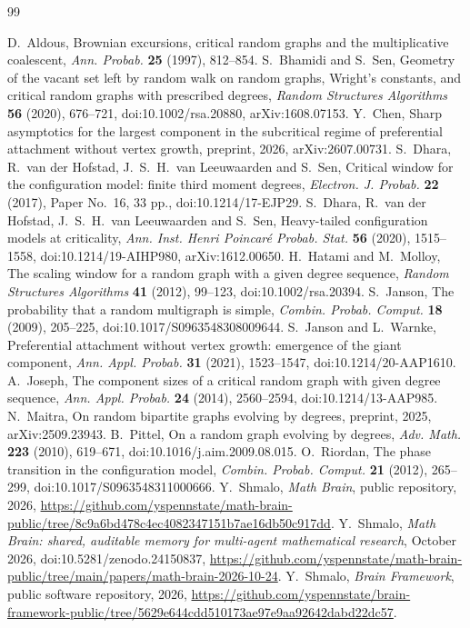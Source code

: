 \documentclass[11pt]{amsart}
\theoremstyle{remark}
\numberwithin{equation}{section}
\begin{document}
\begin{thebibliography}{99}\raggedright
{} D.~Aldous, Brownian excursions, critical random graphs and the multiplicative coalescent, \emph{Ann. Probab.} \textbf{25} (1997), 812--854.
 S.~Bhamidi and S.~Sen, Geometry of the vacant set left by random walk on random graphs, Wright's constants, and critical random graphs with prescribed degrees, \emph{Random Structures Algorithms} \textbf{56} (2020), 676--721, doi:10.1002/rsa.20880, arXiv:1608.07153.
 Y.~Chen, Sharp asymptotics for the largest component in the subcritical regime of preferential attachment without vertex growth, preprint, 2026, arXiv:2607.00731.
 S.~Dhara, R.~van der Hofstad, J.~S.~H.~van Leeuwaarden and S.~Sen, Critical window for the configuration model: finite third moment degrees, \emph{Electron. J. Probab.} \textbf{22} (2017), Paper No.~16, 33 pp., doi:10.1214/17-EJP29.
 S.~Dhara, R.~van der Hofstad, J.~S.~H.~van Leeuwaarden and S.~Sen, Heavy-tailed configuration models at criticality, \emph{Ann. Inst. Henri Poincar\'e Probab. Stat.} \textbf{56} (2020), 1515--1558, doi:10.1214/19-AIHP980, arXiv:1612.00650.
 H.~Hatami and M.~Molloy, The scaling window for a random graph with a given degree sequence, \emph{Random Structures Algorithms} \textbf{41} (2012), 99--123, doi:10.1002/rsa.20394.
 S.~Janson, The probability that a random multigraph is simple, \emph{Combin. Probab. Comput.} \textbf{18} (2009), 205--225, doi:10.1017/S0963548308009644.
 S.~Janson and L.~Warnke, Preferential attachment without vertex growth: emergence of the giant component, \emph{Ann. Appl. Probab.} \textbf{31} (2021), 1523--1547, doi:10.1214/20-AAP1610.
 A.~Joseph, The component sizes of a critical random graph with given degree sequence, \emph{Ann. Appl. Probab.} \textbf{24} (2014), 2560--2594, doi:10.1214/13-AAP985.
 N.~Maitra, On random bipartite graphs evolving by degrees, preprint, 2025, arXiv:2509.23943.
 B.~Pittel, On a random graph evolving by degrees, \emph{Adv. Math.} \textbf{223} (2010), 619--671, doi:10.1016/j.aim.2009.08.015.
 O.~Riordan, The phase transition in the configuration model, \emph{Combin. Probab. Comput.} \textbf{21} (2012), 265--299, doi:10.1017/S0963548311000666.
 Y.~Shmalo, \emph{Math Brain}, public repository, 2026, \url{https://github.com/yspennstate/math-brain-public/tree/8c9a6bd478c4ec4082347151b7ae16db50c917dd}.
 Y.~Shmalo, \emph{Math Brain: shared, auditable memory for multi-agent mathematical research}, October 2026, doi:10.5281/zenodo.24150837, \url{https://github.com/yspennstate/math-brain-public/tree/main/papers/math-brain-2026-10-24}.
 Y.~Shmalo, \emph{Brain Framework}, public software repository, 2026, \url{https://github.com/yspennstate/brain-framework-public/tree/5629e644cdd510173ae97e9aa92642dabd22dc57}.
\end{thebibliography}
\end{document}
